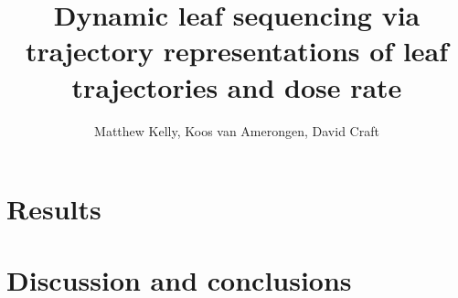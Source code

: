 

\title{Dynamic leaf sequencing via trajectory representations of leaf trajectories and dose rate}

\author{Matthew Kelly, Koos van Amerongen, David Craft}



\maketitle
\thispagestyle{empty}









\section{Results}

\section{Discussion and conclusions}





